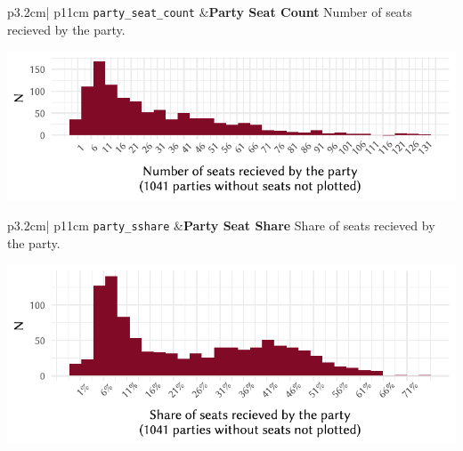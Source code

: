 \documentclass[
]{scrartcl}
\begin{document}
\begin{longtable}{p{3.2cm}| p{11cm}}
\texttt{party\_seat\_count} &\textbf{Party Seat Count}\newline 
Number of seats recieved by the party.

\hspace*{.25cm}
\begin{minipage}[t]{\linewidth }
\vspace{0pt}
\includegraphics[width = \linewidth]{cbfiles/pscplot.pdf}
\end{minipage}


\end{longtable}

\begin{longtable}{p{3.2cm}| p{11cm}}
\texttt{party\_sshare} &\textbf{Party Seat Share}\newline 
Share of seats recieved by the party.

\hspace*{.25cm}
\begin{minipage}[t]{\linewidth }
\vspace{0pt}
\includegraphics[width = \linewidth]{cbfiles/pssplot.pdf}
\end{minipage}


\end{longtable}
\end{document}
